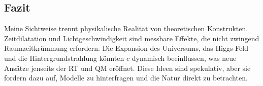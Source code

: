 \documentclass[a4paper,12pt]{article}
\begin{document}
	\subsection{Fazit}
	Meine Sichtweise trennt physikalische Realität von theoretischen Konstrukten. Zeitdilatation und Lichtgeschwindigkeit sind messbare Effekte, die nicht zwingend Raumzeitkrümmung erfordern. Die Expansion des Universums, das Higgs-Feld und die Hintergrundstrahlung könnten \( c \) dynamisch beeinflussen, was neue Ansätze jenseits der RT und QM eröffnet. Diese Ideen sind spekulativ, aber sie fordern dazu auf, Modelle zu hinterfragen und die Natur direkt zu betrachten.
	
\end{document}
